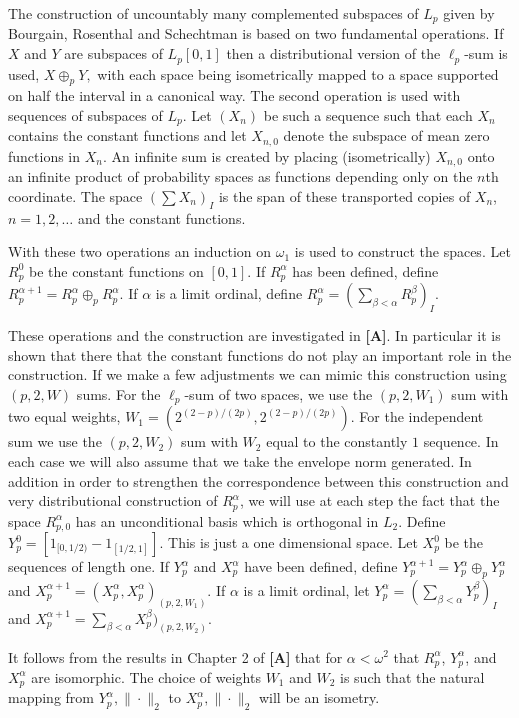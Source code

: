 \documentclass[12pt]{amsart}
\theoremstyle{definition}
\theoremstyle{remark}
\numberwithin{equation}{section}
\begin{document}
The construction of uncountably many complemented subspaces of $L_p$ given
 by Bourgain, Rosenthal and Schechtman is based on two fundamental
operations. If $X$ and $Y$ are subspaces of $L_p[0,1]$ then a
distributional version of the $\ell_p$-sum is used, $X\oplus_p Y,$ with
each space being isometrically mapped to a space supported on half the
interval in a canonical way. The second operation
is used with sequences of subspaces of $L_p$. Let $(X_n)$ be such a
sequence such that each $X_n$ contains the constant functions and let $X_{n,0}$
denote the subspace of mean zero functions in $X_n$. An infinite sum is
created by placing (isometrically)
$X_{n,0}$ onto an infinite product of probability
spaces as functions depending only on the $n$th coordinate.
The space $(\sum X_n)_I$ is the span of these transported copies of
$X_n$, $n=1,2,\dots$ and the constant functions. 

With these two operations an induction on $\omega_1$ is used to
construct the spaces. Let $R_p^0$ be the constant functions on $[0,1]$.
If $R_p^\alpha$ has
been defined, define $R_p^{\alpha+1}=R_p^\alpha \oplus_p R_p^\alpha.$
If $\alpha$ is a limit ordinal, define $R_p^\alpha =(\sum_{\beta<\alpha}
R_p^\beta)_I.$

These operations and the construction are investigated in {\bf[A]}.
In particular it is shown that there that the constant functions do not play an
important role in the construction. If we make a few adjustments we can
mimic this construction using $(p,2,W)$ sums. For the $\ell_p$-sum of
two spaces, we use the $(p,2,W_1)$ sum with two equal weights,
$W_1=(2^{(2-p)/(2p)},2^{(2-p)/(2p)})$. For the independent sum we use the
$(p,2,W_2)$ sum with $W_2$ equal to the constantly $1$ sequence. In each case
we will also assume that we take the envelope norm generated. In addition
 in order to strengthen the correspondence between this construction
and very distributional construction of $R_p^\alpha$,
we will use at each step the fact that the space $R_{p,0}^\alpha$ has an
unconditional  basis which is orthogonal in $L_2$.
Define $Y_p^0 =[1_{[0,1/2)}-1_{[1/2,1]}].$  
This is just  a one dimensional space. Let $X_p^0$ be the
sequences of length one.
If $Y_p^\alpha$ and $X_p^\alpha$ have been defined, define
$Y_p^{\alpha+1}=Y_p^\alpha \oplus_p Y_p^\alpha$ and
$X_p^{\alpha+1}=(X_p^\alpha,X_p^\alpha)_{(p,2,W_1)}.$
If $\alpha$ is a limit ordinal, let $Y_p^\alpha =(\sum_{\beta<\alpha}
Y_p^\beta)_I$ and $X_p^{\alpha+1}=\sum_{\beta<\alpha}
X_p^\beta)_{(p,2,W_2)}$.

It follows from the results in Chapter 2 of {\bf[A]} that for 
$\alpha<\omega^2$
that $R_p^\alpha$, $Y_p^\alpha$, and $X_p^{\alpha}$ are isomorphic. The
choice of weights $W_1$ and $W_2$ is such that the natural mapping from
$Y_p^\alpha,\|\cdot\|_2$ to $X_p^\alpha,\|\cdot\|_2$ will be an isometry.
\end{document}
